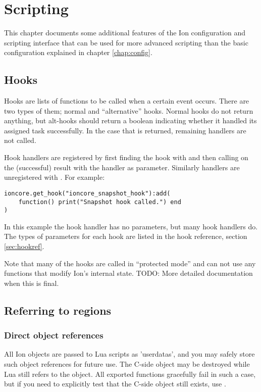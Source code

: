 
\chapter{Scripting}
\label{chap:tricks}

This chapter documents some additional features of the Ion configuration
and scripting interface that can be used for more advanced scripting than
the basic configuration explained in chapter \ref{chap:config}.

\section{Hooks}
\label{sec:hooks}

Hooks are lists of functions to be called when a certain event occurs.
There are two types of them; normal and ``alternative'' hooks. Normal
hooks do not return anything, but alt-hooks should return a boolean
indicating whether it handled its assigned task successfully. In the case
that  is returned, remaining handlers are not called.

Hook handlers are registered by first finding the hook
with  and then calling 
on the (successful) result with the handler as parameter. Similarly
handlers are unregistered with . For example:

\begin{verbatim}
ioncore.get_hook("ioncore_snapshot_hook"):add(
    function() print("Snapshot hook called.") end
)
\end{verbatim}

In this example the hook handler has no parameters, but many hook
handlers do. The types of parameters for each hook are listed in
the hook reference, section \ref{sec:hookref}.


Note that many of the hooks are called in ``protected mode'' and can not 
use any functions that modify Ion's internal state. TODO: More detailed 
documentation when this is final.

\section{Referring to regions}

\subsection{Direct object references}

All Ion objects are passed to Lua scripts as 'userdatas', and you may
safely store such object references for future use. The C-side object
may be destroyed while Lua still refers to the object. All exported
functions gracefully fail in such a case, but if you need to explicitly
test that the C-side object still exists, use .

